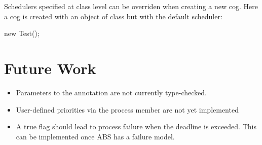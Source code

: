    Schedulers specified at class level can be overriden when creating a
   new cog.  Here a cog is created with an object of class 
   but with the default scheduler:

\begin{absexample} 
   new Test();
\end{absexample} 



\section{Future Work}
\begin{itemize}
\item Parameters to the  annotation are not currently
    type-checked.

\item User-defined priorities via the  process member are not
    yet implemented

\item A true  flag should lead to process failure when the
    deadline is exceeded.  This can be implemented once ABS has a
    failure model.
\end{itemize}